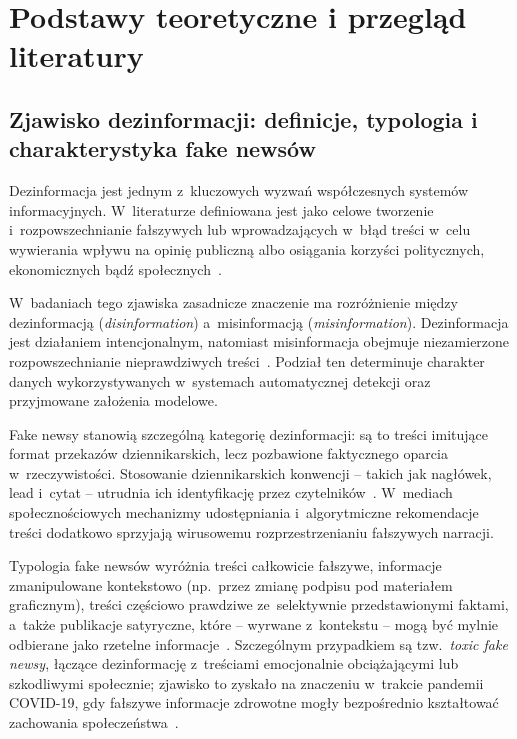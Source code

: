 \documentclass[oneside,polski,logo]{amuthesis}
\begin{document}
\chapter{Podstawy teoretyczne i przegląd literatury}

\section{Zjawisko dezinformacji: definicje, typologia i charakterystyka fake newsów}

Dezinformacja jest jednym z~kluczowych wyzwań współczesnych systemów informacyjnych. W~literaturze definiowana jest jako celowe tworzenie i~rozpowszechnianie fałszywych lub wprowadzających w~błąd treści w~celu wywierania wpływu na opinię publiczną albo osiągania korzyści politycznych, ekonomicznych bądź społecznych~\cite{Shu2017}.

W~badaniach tego zjawiska zasadnicze znaczenie ma rozróżnienie między dezinformacją (\textit{disinformation}) a~misinformacją (\textit{misinformation}). Dezinformacja jest działaniem intencjonalnym, natomiast misinformacja obejmuje niezamierzone rozpowszechnianie nieprawdziwych treści~\cite{Hu2025, Yi2025}. Podział ten determinuje charakter danych wykorzystywanych w~systemach automatycznej detekcji oraz przyjmowane założenia modelowe.

Fake newsy stanowią szczególną kategorię dezinformacji: są to treści imitujące format przekazów dziennikarskich, lecz pozbawione faktycznego oparcia w~rzeczywistości. Stosowanie dziennikarskich konwencji -- takich jak nagłówek, lead i~cytat -- utrudnia ich identyfikację przez czytelników~\cite{Hu2025}. W~mediach społecznościowych mechanizmy udostępniania i~algorytmiczne rekomendacje treści dodatkowo sprzyjają wirusowemu rozprzestrzenianiu fałszywych narracji.

Typologia fake newsów wyróżnia treści całkowicie fałszywe, informacje zmanipulowane kontekstowo (np.\ przez zmianę podpisu pod materiałem graficznym), treści częściowo prawdziwe ze~selektywnie przedstawionymi faktami, a~także publikacje satyryczne, które -- wyrwane z~kontekstu -- mogą być mylnie odbierane jako rzetelne informacje~\cite{Hu2025}. Szczególnym przypadkiem są tzw.\ \textit{toxic fake newsy}, łączące dezinformację z~treściami emocjonalnie obciążającymi lub szkodliwymi społecznie; zjawisko to zyskało na znaczeniu w~trakcie pandemii COVID-19, gdy fałszywe informacje zdrowotne mogły bezpośrednio kształtować zachowania społeczeństwa~\cite{Wani2024}.
\end{document}
